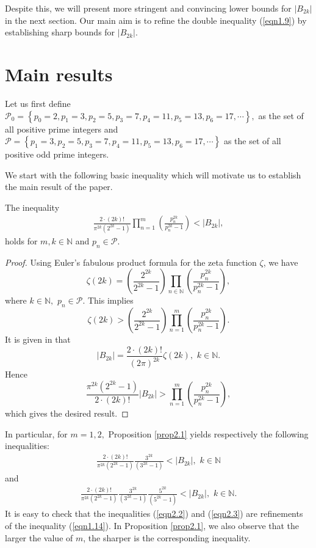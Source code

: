 \documentclass[eqnumis, pdf]{yjb}
\begin{document}
Despite this, we will present more stringent and convincing lower bounds for $ \vert B_{2k} \vert $ in the next section. Our main aim is to refine the double inequality (\ref{eqn1.9}) by establishing sharp bounds for $ \vert B_{2k} \vert .$ 

\section{Main results}\label{sec2}
Let us first define $ \mathcal{P}_0 = \left\lbrace p_0 = 2, p_1 = 3, p_2 = 5, p_3 = 7, p_4 = 11, p_5 = 13, p_6 = 17, \cdots \right\rbrace, $ as the set of all positive prime integers and $ \mathcal{P} = \left\lbrace p_1 = 3, p_2 = 5, p_3 = 7, p_4 = 11, p_5 = 13, p_6 = 17, \cdots \right\rbrace $ as the set of all positive odd prime integers. 

We start with the following basic inequality which will motivate us to establish the main result of the paper.
\begin{proposition}\label{prop2.1}
The inequality  
\begin{align}\label{eqn2.1}
\frac{2 \cdot (2k)!}{\pi^{2k} (2^{2k}-1)} \prod_{n=1}^m \left(\frac{p_n^{2k}}{p_n^{2k}-1}\right) < \vert B_{2k} \vert , 
\end{align}
holds for $m, k \in \mathbb{N} $ and $p_n \in \mathcal{P}$.  
\end{proposition}
\begin{proof}
Using Euler's fabulous product formula \cite{gautschi} for the zeta function $\zeta$, we have 
$$ \zeta(2k) = \left(\frac{2^{2k}}{2^{2k}-1}\right) \prod_{n \in \mathbb{N}} \left(\frac{p_n^{2k}}{p_n^{2k}-1}\right), $$ where $ k \in \mathbb{N}, \, \, p_n \in \mathcal{P}. $ This implies 
$$ \zeta(2k) > \left(\frac{2^{2k}}{2^{2k}-1}\right) \prod_{n=1}^m \left(\frac{p_n^{2k}}{p_n^{2k}-1}\right). $$
It is given in \cite[p. 5, (1.14)]{temme} that 
$$ \vert B_{2k} \vert = \frac{2 \cdot (2k)!}{(2\pi)^{2k}} \zeta(2k), \, \, k \in \mathbb{N}. $$ Hence
$$ \frac{\pi^{2k}(2^{2k} - 1)}{2 \cdot (2k)!} \vert B_{2k} \vert > \prod_{n=1}^m \left(\frac{p_n^{2k}}{p_n^{2k}-1}\right), $$ which gives the desired result.
\end{proof}
In particular, for $ m = 1, 2, $ Proposition \ref{prop2.1} yields respectively the following inequalities:
\begin{align}\label{eqn2.2}
\frac{2 \cdot (2k)!}{\pi^{2k} (2^{2k} - 1)} \frac{3^{2k}}{(3^{2k}-1)} < \vert B_{2k} \vert , \, \, k \in \mathbb{N}
\end{align}
and
\begin{align}\label{eqn2.3}
\frac{2 \cdot (2k)!}{\pi^{2k} (2^{2k} - 1)} \frac{3^{2k}}{(3^{2k}-1)} \frac{5^{2k}}{(5^{2k}-1)} < \vert B_{2k} \vert , \, \, k \in \mathbb{N}.
\end{align}
It is easy to check that the inequalities (\ref{eqn2.2}) and (\ref{eqn2.3}) are refinements of the inequality (\ref{eqn1.14}). In Proposition \ref{prop2.1}, we also observe that the larger the value of $ m $, the sharper is the corresponding inequality.
\end{document}
